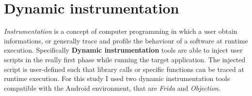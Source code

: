 	\section{Dynamic instrumentation}
	\par \textit{Instrumentation} is a concept of computer programming in which a user obtain informations, or generally trace and profile the behaviour of a software at runtime execution. Specifically \textbf{Dynamic instrumentation} tools are able to inject user scripts in the really first phase while running the target application. The injected script is user-defined such that library calls or specific functions can be traced at runtime execution. For this study I used two dynamic instrumentation tools compatible with the Android environment, that are \textit{Frida} and \textit{Objection}.
	
